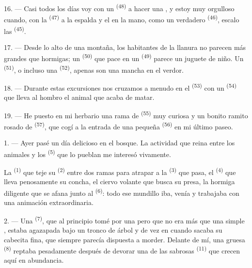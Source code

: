 16. --- Casi todos los días voy con un  \textsuperscript{(48)} a hacer
una , y estoy muy orgulloso cuando, con la 
\textsuperscript{(47)} a la espalda y el  en la mano, como un
verdadero  \textsuperscript{(46)}, escalo las 
\textsuperscript{(45)}.

17. --- Desde lo alto de una montaña, los habitantes de la llanura no
parecen más grandes que hormigas; un 
\textsuperscript{(50)} que pace en un  \textsuperscript{(49)} parece un
juguete de niño. Un  \textsuperscript{(51)}, o incluso una  \textsuperscript{(52)}, apenas son una mancha en el verdor.

18. --- Durante estas excursiones nos cruzamos a menudo en el
 \textsuperscript{(53)} con un 
\textsuperscript{(54)} que lleva al hombro el animal que acaba de matar.

19. --- He puesto en mi herbario una rama de  \textsuperscript{(55)}
muy curiosa y un bonito ramito rosado de  \textsuperscript{(57)}, que
cogí a la entrada de una pequeña  \textsuperscript{(56)} en mi último
paseo.

\VUsaut{3.0mm}
\VUsaut{3.0mm}

\VUsaut{3.0mm}

1. --- Ayer pasé un día delicioso en el bosque. La actividad que reina
entre los animales y los  \textsuperscript{(5)} que lo pueblan me
interesó vivamente.

La  \textsuperscript{(1)} que teje su  \textsuperscript{(2)} entre
dos ramas para atrapar a la  \textsuperscript{(3)} que pasa, el
 \textsuperscript{(4)} que lleva penosamente su concha, el ciervo
volante que busca su presa, la hormiga diligente que se afana junto al
 \textsuperscript{(6)}: todo ese mundillo iba, venía y trabajaba
con una animación extraordinaria.

2. --- Una  \textsuperscript{(7)}, que al principio tomé por una
 pero que no era más que una simple , estaba
agazapada bajo un tronco de árbol y de vez en cuando sacaba su cabecita
fina, que siempre parecía dispuesta a morder. Delante de mí, una gruesa
 \textsuperscript{(8)} reptaba pesadamente después de devorar una de
las sabrosas  \textsuperscript{(11)} que crecen aquí en
abundancia.

